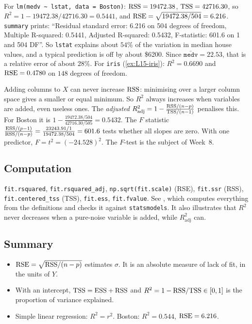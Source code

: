 \begin{example}\label{ex:L17-boston}
For \texttt{lm(medv \textasciitilde\ lstat, data = Boston)}:
$\mathrm{RSS}=19472.38$, $\mathrm{TSS}=42716.30$, so $R^2=1-19472.38/42716.30=0.5441$, and
$\mathrm{RSE}=\sqrt{19472.38/504}=6.216$. \texttt{summary} prints: ``Residual standard error: 6.216 on 504 degrees of freedom,
Multiple R-squared: 0.5441, Adjusted R-squared: 0.5432, F-statistic: 601.6 on 1 and 504 DF''. So
\texttt{lstat} explains about $54\%$ of the variation in median house values, and a typical prediction is off by about
\$6200. Since $\bar{\texttt{medv}}=22.53$, that is a relative error of about $28\%$.
For \texttt{iris} (\cref{ex:L15-iris}): $R^2=0.6690$ and $\mathrm{RSE}=0.4780$ on $148$ degrees of freedom.
\end{example}

\begin{note}
Adding columns to $X$ can never increase $\mathrm{RSS}$: minimising over a larger column space gives a smaller or equal
minimum. So $R^2$ always increases when variables are added, even useless ones. The \emph{adjusted}
$R^2_{\mathrm{adj}}=1-\frac{\mathrm{RSS}/(n-p)}{\mathrm{TSS}/(n-1)}$ penalises this. For Boston it is $1-\frac{19472.38/504}{42716.30/505}=0.5432$.
The $F$ statistic $\frac{\mathrm{ESS}/(p-1)}{\mathrm{RSS}/(n-p)}=\frac{23243.91/1}{19472.38/504}=601.6$ tests whether all slopes are
zero. With one predictor, $F=t^2=(-24.528)^2$. The $F$-test is the subject of Week~8.
\end{note}

\subsection{Computation}
\texttt{fit.rsquared}, \texttt{fit.rsquared\_adj}, \texttt{np.sqrt(fit.scale)} (RSE), \texttt{fit.ssr} (RSS),
\texttt{fit.centered\_tss} (TSS), \texttt{fit.ess}, \texttt{fit.fvalue}. See , which
computes everything from the definitions and checks it against \texttt{statsmodels}. It also illustrates that
$R^2$ never decreases when a pure-noise variable is added, while $R^2_{\mathrm{adj}}$ can.

\subsection{Summary}
\begin{itemize}
  \item $\mathrm{RSE}=\sqrt{\mathrm{RSS}/(n-p)}$ estimates $\sigma$. It is an absolute measure of lack of fit, in the units of $Y$.
  \item With an intercept, $\mathrm{TSS}=\mathrm{ESS}+\mathrm{RSS}$ and $R^2=1-\mathrm{RSS}/\mathrm{TSS}\in[0,1]$ is the proportion of variance explained.
  \item Simple linear regression: $R^2=r^2$. Boston: $R^2=0.544$, $\mathrm{RSE}=6.216$.
\end{itemize}


